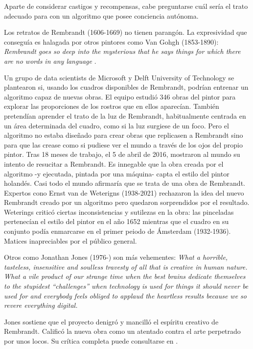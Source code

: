 \documentclass[main.tex]{subfiles}
\begin{document}
Aparte de considerar castigos y recompensas, cabe preguntarse cuál sería el trato adecuado para con un algoritmo que posee conciencia autónoma.

Los retratos de Rembrandt (1606-1669) no tienen parangón. La expresividad que conseguía es halagada por otros pintores como Van Gohgh (1853-1890): \textit{Rembrandt goes so deep into the mysterious that he says things for which there are no words in any language} \cite{van2003letters}.

Un grupo de data scientists de Microsoft y Delft University of Technology se plantearon si, usando los cuadros disponibles de Rembrandt,  podrían entrenar un algoritmo  capaz de nuevas obras. El equipo estudió 346 obras del pintor para explorar las proporciones de los rostros que en ellos aparecían. También pretendían aprender el trato de la luz de Rembrandt, habitualmente centrada en un área determinada del cuadro, como si la luz surgiese de un foco.  Pero el algoritmo no estaba diseñado para crear obras que replicasen a Rembrandt sino para que las crease como si pudiese ver el mundo a través de los ojos del propio pintor. Tras 18 meses de trabajo, el 5 de abril de 2016, mostraron al mundo su intento de resucitar a Rembrandt. Es innegable que la obra creada por el algoritmo -y ejecutada, pintada por una máquina- capta el estilo del pintor holandés. Casi todo el mundo afirmaría que se trata de una obra de Rembrandt. Expertos cono Ernst van de Weterigns (1938-2021) rechazaron la idea del nuevo Rembrandt creado por un algoritmo pero quedaron sorprendidos por el resultado. Weterings  criticó ciertas inconsistencias y sutilezas en la obra: las pinceladas pertenecían el estilo del pintor en el año 1652 mientras que el cuadro en su conjunto podía enmarcarse en el primer peiodo de Ámsterdam (1932-1936). Matices inapreciables por el público general.



Otros como Jonathan Jones (1976-) son más vehementes: \textit{What a horrible, tasteless, insensitive and soulless travesty of all that is
creative in human nature. What a vile product of our strange time when the best brains
dedicate themselves to the stupidest “challenges” when technology is used
for things it should never be used for and everybody feels obliged to applaud
the heartless results because we so revere everything digital.}

Jones sostiene que el proyecto denigró y mancilló el espíritu creativo de Rembrandt. Calificó la nueva obra como un atentado contra el arte perpetrado por unos locos. Su crítica completa puede consultarse en \cite{jjr}.
\end{document}
